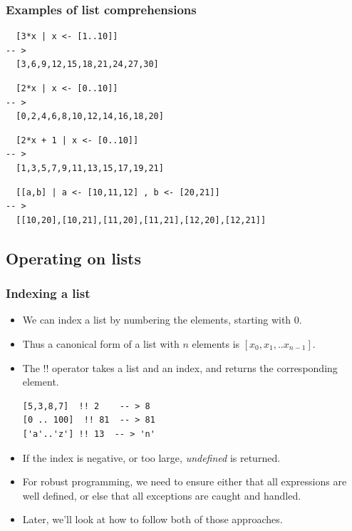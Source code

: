 \documentclass{beamer}
\begin{document}
\begin{frame}[fragile]
\frametitle{Examples of list comprehensions}

\begin{verbatim}
  [3*x | x <- [1..10]]
-- >
  [3,6,9,12,15,18,21,24,27,30]
\end{verbatim}

\begin{verbatim}
  [2*x | x <- [0..10]]
-- >
  [0,2,4,6,8,10,12,14,16,18,20]
\end{verbatim}

\begin{verbatim}
  [2*x + 1 | x <- [0..10]]
-- >
  [1,3,5,7,9,11,13,15,17,19,21]
\end{verbatim}

\begin{verbatim}
  [[a,b] | a <- [10,11,12] , b <- [20,21]]
-- >
  [[10,20],[10,21],[11,20],[11,21],[12,20],[12,21]]
\end{verbatim}

\end{frame}

\subsection{Operating on lists}

\begin{frame}[fragile]
\frametitle{Indexing a list}

\begin{itemize}
\item We can index a list by numbering the elements, starting with
  0.
\item Thus a canonical form of a list with $n$ elements is $[x_0,
  x_1, .. x_{n-1}]$.
\item The $!!$ operator takes a list and an index, and
  returns the corresponding element.
  \begin{verbatim}
[5,3,8,7]  !! 2    -- > 8
[0 .. 100]  !! 81  -- > 81
['a'..'z'] !! 13  -- > 'n'
  \end{verbatim}
\item If the index is negative, or too large, \emph{undefined} is returned.
\item For robust programming, we need to ensure either that all
  expressions are well defined, or else that all exceptions are
  caught and handled.
\item Later, we'll look at how to follow both of those approaches.
\end{itemize}

\end{frame}
\end{document}

